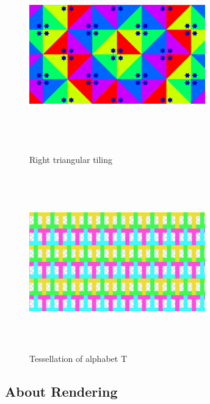 \begin{figure}[h!tbp]
 \begin{minipage}{0.49\hsize}
  \center
  \includegraphics[width=3in, height=3in, keepaspectratio]{../img/tessellation/rightTriangular.pdf}
  \caption{Right triangular tiling}
  \label{fig:rightTriangular}
 \end{minipage}
 \begin{minipage}{0.49\hsize}
  \center
  \includegraphics[width=3in, height=3in, keepaspectratio]{../img/tessellation/tessellationT.pdf}
  \caption{Tessellation of alphabet T}
  \label{fig:tessellationT}
 \end{minipage}
\end{figure}

\subsection{About Rendering}

